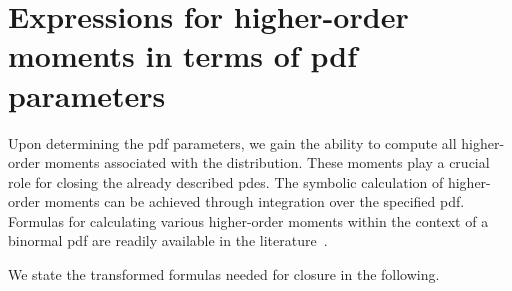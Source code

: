 \section{Expressions for higher-order moments in terms of pdf parameters}
\label{sec:expressions-for-higher-order-moments-in-terms-of-pdf-parameters}

Upon determining the \gls{pdf} parameters,
we gain the ability to compute all higher-order moments associated with the distribution.
These moments play a crucial role for closing the already described \glspl{pde}.
The symbolic calculation of higher-order moments can be achieved
through integration over the specified \gls{pdf}.
Formulas for calculating various higher-order moments within the context of a binormal \gls{pdf}
are readily available in the literature~\autocite{larson2005using}.

We state the transformed formulas needed for closure in the following.

